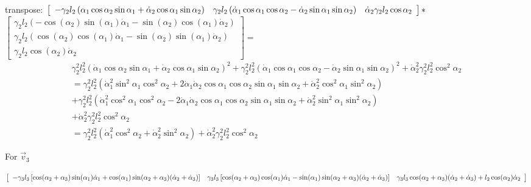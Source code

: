 \documentclass{article}
\begin{document}
transpose: $\left[ 
\begin{array}{ccc}
-\gamma _{2}l_{2}\left( \alpha _{1}\cos \alpha _{2}\sin \alpha _{1}+\dot{%
\alpha}_{2}\cos \alpha _{1}\sin \alpha _{2}\right)  & \gamma _{2}l_{2}\left( 
\dot{\alpha}_{1}\cos \alpha _{1}\cos \alpha _{2}-\dot{\alpha}_{2}\sin \alpha
_{1}\sin \alpha _{2}\right)  & \dot{\alpha}_{2}\gamma _{2}l_{2}\cos \alpha
_{2}%
\end{array}%
\right] \allowbreak \ast $ $\left[ 
\begin{array}{c}
\gamma _{2}l_{2}\left( -\cos (\alpha _{2})\sin (\alpha _{1})\dot{\alpha}%
_{1}-\sin (\alpha _{2})\cos (\alpha _{1})\dot{\alpha}_{2}\right)  \\ 
\gamma _{2}l_{2}\left( \cos (\alpha _{2})\cos (\alpha _{1})\dot{\alpha}%
_{1}-\sin (\alpha _{2})\sin (\alpha _{1})\dot{\alpha}_{2}\right)  \\ 
\gamma _{2}l_{2}\cos (\alpha _{2})\dot{\alpha}_{2}%
\end{array}%
\right] =\allowbreak $%
\[
\begin{array}{c}
\gamma _{2}^{2}l_{2}^{2}\left( \dot{\alpha}_{1}\cos \alpha _{2}\sin \alpha
_{1}+\dot{\alpha}_{2}\cos \alpha _{1}\sin \alpha _{2}\right) ^{2}+\gamma
_{2}^{2}l_{2}^{2}\left( \dot{\alpha}_{1}\cos \alpha _{1}\cos \alpha _{2}-%
\dot{\alpha}_{2}\sin \alpha _{1}\sin \alpha _{2}\right) ^{2}+\dot{\alpha}%
_{2}^{2}\gamma _{2}^{2}l_{2}^{2}\cos ^{2}\alpha _{2}\allowbreak  \\ 
=\gamma _{2}^{2}l_{2}^{2}\left( \dot{\alpha}_{1}^{2}\sin ^{2}\alpha _{1}\cos
^{2}\alpha _{2}+2\dot{\alpha}_{1}\dot{\alpha}_{2}\cos \alpha _{1}\cos \alpha
_{2}\sin \alpha _{1}\sin \alpha _{2}+\dot{\alpha}_{2}^{2}\cos ^{2}\alpha
_{1}\sin ^{2}\alpha _{2}\right)  \\ 
+\gamma _{2}^{2}l_{2}^{2}\left( \dot{\alpha}_{1}^{2}\cos ^{2}\alpha _{1}\cos
^{2}\alpha _{2}-2\dot{\alpha}_{1}\dot{\alpha}_{2}\cos \alpha _{1}\cos \alpha
_{2}\sin \alpha _{1}\sin \alpha _{2}+\dot{\alpha}_{2}^{2}\sin ^{2}\alpha
_{1}\sin ^{2}\alpha _{2}\right)  \\ 
+\dot{\alpha}_{2}^{2}\gamma _{2}^{2}l_{2}^{2}\cos ^{2}\alpha _{2} \\ 
=\gamma _{2}^{2}l_{2}^{2}\left( \dot{\alpha}_{1}^{2}\cos ^{2}\alpha _{2}+%
\dot{\alpha}_{2}^{2}\sin ^{2}\alpha _{2}\right) +\dot{\alpha}_{2}^{2}\gamma
_{2}^{2}l_{2}^{2}\cos ^{2}\alpha _{2}%
\end{array}%
\]

\bigskip For $\vec{v}_{3}$

$\left[ 
\begin{array}{ccc}
-\gamma _{3}l_{3}\left[ \cos (\alpha _{2}+\alpha _{3})\sin (\alpha _{1})\dot{%
\alpha}_{1}+\cos (\alpha _{1})\sin (\alpha _{2}+\alpha _{3})(\dot{\alpha}%
_{2}+\dot{\alpha}_{3})\right]  & \gamma _{3}l_{3}\left[ \cos (\alpha
_{2}+\alpha _{3})\cos (\alpha _{1})\dot{\alpha}_{1}-\sin (\alpha _{1})\sin
(\alpha _{2}+\alpha _{3})(\dot{\alpha}_{2}+\dot{\alpha}_{3})\right]  & 
\gamma _{3}l_{3}\cos (\alpha _{2}+\alpha _{3})(\dot{\alpha}_{2}+\dot{\alpha}%
_{3})+l_{2}\cos (\alpha _{2})\dot{\alpha}_{2}%
\end{array}%
\right] $
\end{document}
